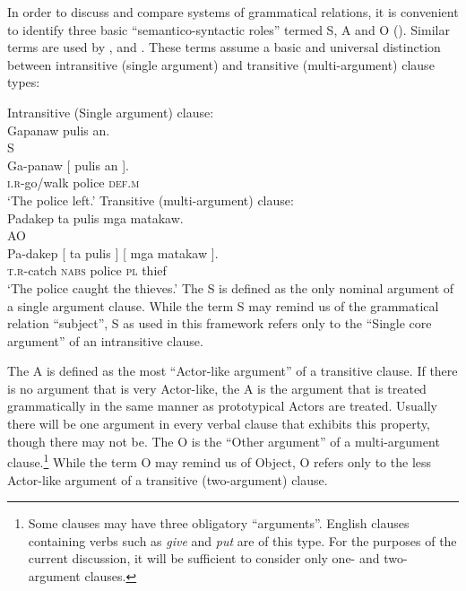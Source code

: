 In order to discuss and compare systems of grammatical relations, it is convenient to identify three basic “semantico-syntactic roles”  termed S, A and O (\citealt{dixon1972, dixon1979, dixon1994}). Similar terms are used by \citet{silverstein1976}, and \citet{comrie1989}. These terms assume a basic and universal distinction between intransitive (single argument) and transitive (multi-argument) clause types:

\ea
\label{bkm:Ref482783415}
    \ea 
    \label{ex:gapanawpulisan}
    Intransitive (Single argument) clause: \\
    Gapanaw pulis an. \\
    \hspace{3cm}S \\
    \gll Ga-panaw [ pulis an ]. \\
    \textsc{i.r}-go/walk {} police \textsc{def.m} \\
    \glt ‘The police left.’
    \ex
    Transitive (multi-argument) clause: \\
    Padakep ta pulis mga matakaw. \\
    \hspace{3cm}A\hspace{3cm}O \\
    \gll Pa-dakep [ ta pulis ] [ mga matakaw ]. \\
    \textsc{t.r}-catch {} \textsc{nabs} police {} {} \textsc{pl} thief \\
    \glt ‘The police caught the thieves.’
    \z
\z
The S is defined as the only nominal argument of a single argument clause. While the term S may remind us of the grammatical relation “subject”, S as used in this framework refers only to the “Single core argument” of an intransitive clause.

The A is defined as the most “Actor-like argument” of a transitive clause. If there is no argument that is very Actor-like, the A is the argument that is treated grammatically in the same manner as prototypical Actors are treated. Usually there will be one argument in every verbal clause that exhibits this property, though there may not be. The O is the “Other argument” of a multi-argument clause.\footnote{Some clauses may have three obligatory “arguments”. English clauses containing verbs such as \textit{give} and \textit{put} are of this type. For the purposes of the current discussion, it will be sufficient to consider only one- and two-argument clauses.}  While the term O may remind us of Object, O refers only to the less Actor-like argument of a transitive (two-argument) clause.

